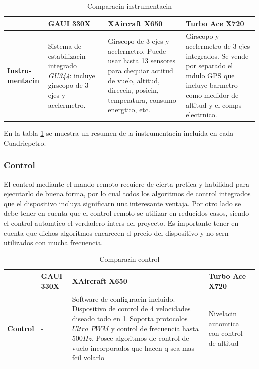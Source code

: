 \documentclass[spanish,12pt,a4paper,titlepage]{report}
\begin{document}
\begin{table}[H]
\begin{tabular}{p{40pt}|p{85pt}|p{125pt}|p{130pt}|} 
\cline{2-4}
& \cellcolor[gray]{0.8} \textbf{GAUI 330X} 
& \cellcolor[gray]{0.8} \textbf{XAircraft X650} 
& \cellcolor[gray]{0.8} \textbf{Turbo Ace X720} \\ \cline{2-4} \hline
\multicolumn{1}{|p{40pt}|}{\cellcolor[gray]{0.8}\textbf{Instru- mentacin}} 
& Sistema de estabilizacin integrado \emph{GU344}: incluye girscopo de 3 ejes y acelermetro. & Girscopo de 3 ejes y acelermetro. Puede usar hasta 13 sensores para chequiar actitud de vuelo, altitud, direccin, posicin, temperatura, consumo energtico, etc. & Girscopo y acelermetro de 3 ejes integrados. Se vende por separado el mdulo GPS que incluye barmetro como medidor de altitud y el comps electrnico.\\ 
\hline 
\end{tabular}
\caption{Comparacin instrumentacin}
\label{tab:instrumentacion}
\end{table}

	En la tabla \ref{tab:instrumentacion} se muestra un resumen de la instrumentacin incluida en cada Cuadricpetro. 

\subsubsection*{Control}

	El control mediante el mando remoto requiere de cierta prctica y habilidad para ejecutarlo de buena forma, por lo cual todos los algoritmos de control integrados que el dispositivo incluya significarn una interesante ventaja. Por otro lado se debe tener en cuenta que el control remoto se utilizar en reducidos casos, siendo el control automtico el verdadero inters del proyecto. Es importante tener en cuenta que dichos algoritmos encarecen el precio del dispositivo y no sern utilizados con mucha frecuencia.

\begin{table}[H]
\begin{tabular}{p{40pt}|p{70pt}|p{160pt}|p{110pt}|} 
\cline{2-4}
& \cellcolor[gray]{0.8} \textbf{GAUI 330X} 
& \cellcolor[gray]{0.8} \textbf{XAircraft X650} 
& \cellcolor[gray]{0.8} \textbf{Turbo Ace X720} \\ \cline{2-4} \hline
\multicolumn{1}{|p{40pt}|}{\cellcolor[gray]{0.8}\textbf{Control}} 
& - & Software de configuracin incluido. Dispositivo de control de 4 velocidades diseado todo en 1. Soporta protocolos $Ultra$ $PWM$ y control de frecuencia hasta $500Hz$. Posee algoritmos de control de vuelo incorporados que hacen q sea mas fcil volarlo & Nivelacin automtica con control de altitud \\ 
\hline 
\end{tabular}
\caption{Comparacin control}
\label{tab:control}
\end{table}
\end{document}
